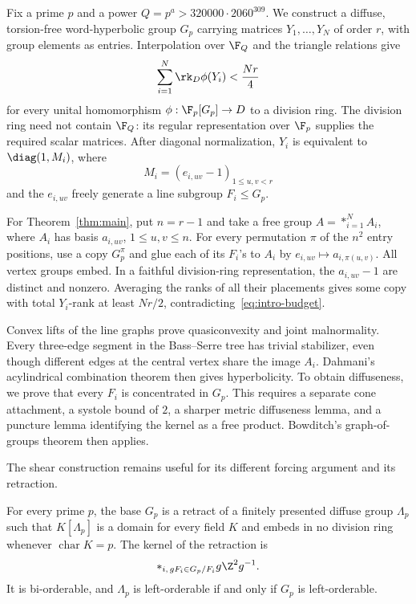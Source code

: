Fix a prime \(p\) and a power \(Q=p^a>320000\cdot2060^{309}\).
We construct a diffuse, torsion-free word-hyperbolic group \(G_p\)
carrying matrices \(Y_1,\ldots,Y_N\) of order \(r\), with group elements
as entries. Interpolation over \(\F_Q\) and the triangle relations give
\begin{equation}\label{eq:intro-budget}
 \sum_{i=1}^N\rk_D\phi(Y_i)<\frac{Nr}{4}
\end{equation}
for every unital homomorphism \(\phi:\F_p[G_p]\to D\) to a division
ring. The division ring need not contain \(\F_Q\): its regular
representation over \(\F_p\) supplies the required scalar matrices.
After diagonal normalization, \(Y_i\) is equivalent to
\(\diag(1,M_i)\), where
\[
 M_i=(e_{i,uv}-1)_{1\le u,v<r}
\]
and the \(e_{i,uv}\) freely generate a line subgroup \(F_i\le G_p\).

For Theorem~\ref{thm:main}, put \(n=r-1\) and take a free group
\(A=*_{i=1}^N A_i\), where \(A_i\) has basis
\(a_{i,uv}\), \(1\le u,v\le n\). For every permutation \(\pi\) of the
\(n^2\) entry positions, use a copy \(G_p^\pi\) and glue each of its
\(F_i\)'s to \(A_i\) by \(e_{i,uv}\mapsto a_{i,\pi(u,v)}\).
All vertex groups embed. In a faithful division-ring representation,
the \(a_{i,uv}-1\) are distinct and nonzero. Averaging the ranks of
all their placements gives some copy with total \(Y_i\)-rank at
least \(Nr/2\), contradicting~\eqref{eq:intro-budget}.

Convex lifts of the line graphs prove quasiconvexity and joint
malnormality. Every three-edge segment in the Bass--Serre tree has
trivial stabilizer, even though different edges at the central vertex
share the image \(A_i\). Dahmani's acylindrical combination theorem
then gives hyperbolicity. To obtain diffuseness, we prove that every
\(F_i\) is concentrated in \(G_p\). This requires a separate cone
attachment, a systole bound of \(2\), a sharper metric diffuseness
lemma, and a puncture lemma identifying the kernel as a free product.
Bowditch's graph-of-groups theorem then applies.

The shear construction remains useful for its different
forcing argument and its retraction.
\begin{maintheorem}\label{thm:shear}
For every prime \(p\), the base \(G_p\) is a retract of a finitely
presented diffuse group \(\Lambda_p\) such that \(K[\Lambda_p]\) is a
domain for every field \(K\) and embeds in no division ring whenever
\(\operatorname{char}K=p\). The kernel of the retraction is
\[
 *_{i,\,gF_i\in G_p/F_i}g\Z^2g^{-1}.
\]
It is bi-orderable, and \(\Lambda_p\) is left-orderable if and only if
\(G_p\) is left-orderable.
\end{maintheorem}

